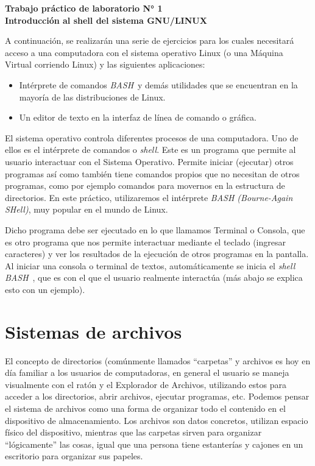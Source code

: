 \documentclass[12pt]{article}
\def\maketitle{

\makeatletter
{\color{bl} \centering \huge \sc \textbf{ Trabajo práctico de laboratorio N° 1\\ \large
\vspace*{-8pt} \color{black} Introducción al shell del sistema GNU/LINUX \vspace*{8pt} }\par}
\makeatother

\makeatletter


}
\newcommand{\bash}{\emph{BASH}\ }
\begin{document}
\thispagestyle{empty}
\maketitle
\setlength{\parindent}{1pt}

A continuación, se realizarán una serie de ejercicios para los cuales
necesitará acceso a una computadora con el sistema operativo Linux (o una
Máquina Virtual corriendo Linux) y las siguientes aplicaciones:

\begin{itemize}
        
    \item   Intérprete de comandos \bash y demás utilidades que se encuentran
        en la mayoría de las distribuciones de Linux.
        
    \item   Un editor de texto en la interfaz de línea de comando o gráfica.

\end{itemize}

El sistema operativo controla diferentes procesos de una computadora. Uno de
ellos es el intérprete de comandos o \emph{shell}. Este es un programa que
permite al usuario interactuar con el Sistema Operativo. Permite iniciar
(ejecutar) otros programas así como también tiene comandos propios que no
necesitan de otros programas, como por ejemplo comandos para movernos en la
estructura de directorios. En este práctico, utilizaremos el intérprete
\emph{BASH (Bourne-Again SHell)}, muy popular en el mundo de Linux.

Dicho programa debe ser ejecutado en lo que llamamos Terminal o Consola, que
es otro programa que nos permite interactuar mediante el teclado (ingresar
caracteres) y ver los resultados de la ejecución de otros programas en la
pantalla. Al iniciar una consola o terminal de textos, automáticamente se
inicia el \emph{shell} \bash, que es con el que el usuario realmente
interactúa (más abajo se explica esto con un ejemplo).

\section{Sistemas de archivos}

El concepto de directorios (comúnmente llamados ``carpetas'' y archivos es hoy
en día familiar a los usuarios de computadoras, en general el usuario se
maneja visualmente con el ratón y el Explorador de Archivos, utilizando estos
para acceder a los directorios, abrir archivos, ejecutar programas, etc. Podemos
pensar el sistema de archivos como una forma de organizar todo el contenido en
el dispositivo de almacenamiento. Los archivos son datos concretos, utilizan
espacio físico del dispositivo, mientras que las carpetas sirven para
organizar ``lógicamente'' las cosas, igual que una persona tiene estanterías y
cajones en un escritorio para organizar sus papeles.
\end{document}
